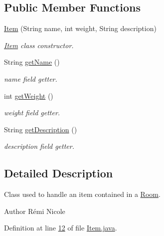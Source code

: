 \subsection*{Public Member Functions}
\begin{DoxyCompactItemize}
\item 
\hyperlink{classpkg__world_1_1pkg__items_1_1Item_a7ece2bd85f9e388cb9c2813f0b5ecc4e}{Item} (String name, int weight, String description)
\begin{DoxyCompactList}\small\item\em \hyperlink{classpkg__world_1_1pkg__items_1_1Item}{Item} class constructor. \end{DoxyCompactList}\item 
String \hyperlink{classpkg__world_1_1pkg__items_1_1Item_ab541df9aad01409656af1aadfa66987a}{get\-Name} ()
\begin{DoxyCompactList}\small\item\em name field getter. \end{DoxyCompactList}\item 
int \hyperlink{classpkg__world_1_1pkg__items_1_1Item_afd46034ba99392bbe4a4432150c870d4}{get\-Weight} ()
\begin{DoxyCompactList}\small\item\em weight field getter. \end{DoxyCompactList}\item 
String \hyperlink{classpkg__world_1_1pkg__items_1_1Item_ac2f68a92afd7e089cc4b955c37a63417}{get\-Description} ()
\begin{DoxyCompactList}\small\item\em description field getter. \end{DoxyCompactList}\end{DoxyCompactItemize}


\subsection{Detailed Description}
Class used to handle an item contained in a \hyperlink{classpkg__world_1_1Room}{Room}. 

\begin{DoxyAuthor}{Author}
Rémi Nicole 
\end{DoxyAuthor}


Definition at line \hyperlink{Item_8java_source_l00012}{12} of file \hyperlink{Item_8java_source}{Item.\-java}.




